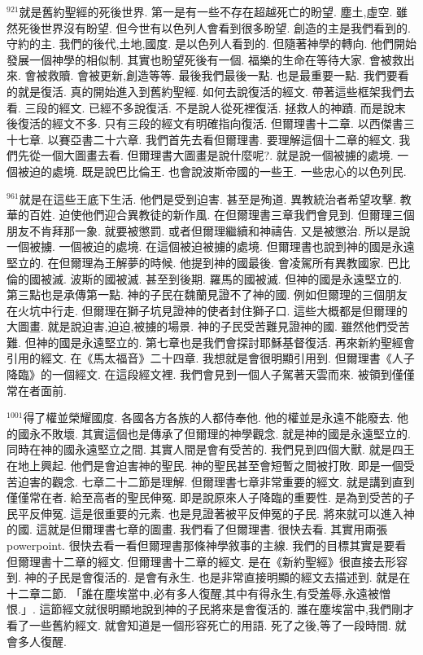 \documentclass{book}
\begin{document}
$^{921}$就是舊約聖經的死後世界.
第一是有一些不存在超越死亡的盼望.
塵土,虛空.
雖然死後世界沒有盼望.
但今世有以色列人會看到很多盼望.
創造的主是我們看到的.
守約的主.
我們的後代,土地,國度.
是以色列人看到的.
但隨著神學的轉向.
他們開始發展一個神學的相似制.
其實也盼望死後有一個.
福樂的生命在等待大家.
會被救出來.
會被救贖.
會被更新,創造等等.
最後我們最後一點.
也是最重要一點.
我們要看的就是復活.
真的開始進入到舊約聖經.
如何去說復活的經文.
帶著這些框架我們去看.
三段的經文.
已經不多說復活.
不是說人從死裡復活.
拯救人的神蹟.
而是說末後復活的經文不多.
只有三段的經文有明確指向復活.
但爾理書十二章.
以西傑書三十七章.
以賽亞書二十六章.
我們首先去看但爾理書.
要理解這個十二章的經文.
我們先從一個大圖畫去看.
但爾理書大圖畫是說什麼呢?.
就是說一個被擄的處境.
一個被迫的處境.
既是說巴比倫王.
也會說波斯帝國的一些王.
一些忠心的以色列民.

$^{961}$就是在這些王底下生活.
他們是受到迫害.
甚至是殉道.
異教統治者希望攻擊.
教華的百姓.
迫使他們迎合異教徒的新作風.
在但爾理書三章我們會見到.
但爾理三個朋友不肯拜那一象.
就要被懲罰.
或者但爾理繼續和神禱告.
又是被懲治.
所以是說一個被擄.
一個被迫的處境.
在這個被迫被擄的處境.
但爾理書也說到神的國是永遠堅立的.
在但爾理為王解夢的時候.
他提到神的國最後.
會凌駕所有異教國家.
巴比倫的國被滅.
波斯的國被滅.
甚至到後期.
羅馬的國被滅.
但神的國是永遠堅立的.
第三點也是承傳第一點.
神的子民在魏蘭見證不了神的國.
例如但爾理的三個朋友在火坑中行走.
但爾理在獅子坑見證神的使者封住獅子口.
這些大概都是但爾理的大圖畫.
就是說迫害,迫迫,被擄的場景.
神的子民受苦難見證神的國.
雖然他們受苦難.
但神的國是永遠堅立的.
第七章也是我們會探討耶穌基督復活.
再來新約聖經會引用的經文.
在《馬太福音》二十四章.
我想就是會很明顯引用到.
但爾理書《人子降臨》的一個經文.
在這段經文裡.
我們會見到一個人子駕著天雲而來.
被領到僅僅常在者面前.

$^{1001}$得了權並榮耀國度.
各國各方各族的人都侍奉他.
他的權並是永遠不能廢去.
他的國永不敗壞.
其實這個也是傳承了但爾理的神學觀念.
就是神的國是永遠堅立的.
同時在神的國永遠堅立之間.
其實人間是會有受苦的.
我們見到四個大獸.
就是四王在地上興起.
他們是會迫害神的聖民.
神的聖民甚至會短暫之間被打敗.
即是一個受苦迫害的觀念.
七章二十二節是理解.
但爾理書七章非常重要的經文.
就是講到直到僅僅常在者.
給至高者的聖民伸冤.
即是說原來人子降臨的重要性.
是為到受苦的子民平反伸冤.
這是很重要的元素.
也是見證著被平反伸冤的子民.
將來就可以進入神的國.
這就是但爾理書七章的圖畫.
我們看了但爾理書.
很快去看.
其實用兩張powerpoint.
很快去看一看但爾理書那條神學敘事的主線.
我們的目標其實是要看但爾理書十二章的經文.
但爾理書十二章的經文.
是在《新約聖經》很直接去形容到.
神的子民是會復活的.
是會有永生.
也是非常直接明顯的經文去描述到.
就是在十二章二節.
「誰在塵埃當中,必有多人復醒,其中有得永生,有受羞辱,永遠被憎恨.」.
這節經文就很明顯地說到神的子民將來是會復活的.
誰在塵埃當中,我們剛才看了一些舊約經文.
就會知道是一個形容死亡的用語.
死了之後,等了一段時間.
就會多人復醒.
\end{document}
